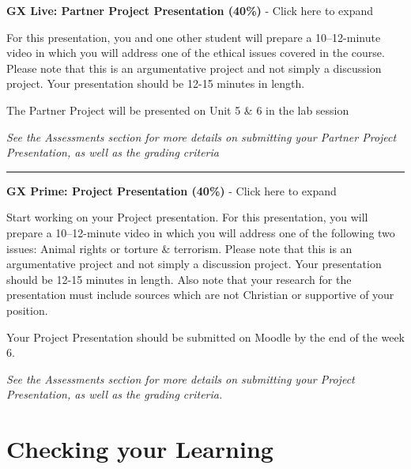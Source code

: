 \documentclass[
]{book}
\begin{document}
\begin{assessment}
\textbf{GX Live: Partner Project Presentation (40\%)} - Click here to expand

For this presentation, you and one other student will prepare a 10--12-minute video in which you will address one of the ethical issues covered in the course. Please note that this is an argumentative project and not simply a discussion project. Your presentation should be 12-15 minutes in length.

The Partner Project will be presented on Unit 5 \& 6 in the lab session

\emph{See the Assessments section for more details on submitting your Partner Project Presentation, as well as the grading criteria}

\begin{center}\rule{0.5\linewidth}{0.5pt}\end{center}

\textbf{GX Prime: Project Presentation (40\%)} - Click here to expand

Start working on your Project presentation. For this presentation, you will prepare a 10--12-minute video in which you will address one of the following two issues: Animal rights or torture \& terrorism. Please note that this is an argumentative project and not simply a discussion project. Your presentation should be 12-15 minutes in length. Also note that your research for the presentation must include sources which are not Christian or supportive of your position.

Your Project Presentation should be submitted on Moodle by the end of the week 6.

\emph{See the Assessments section for more details on submitting your Project Presentation, as well as the grading criteria.}
\end{assessment}

\hypertarget{checking-your-learning-5}{%
\section*{Checking your Learning}\label{checking-your-learning-5}}
\end{document}
